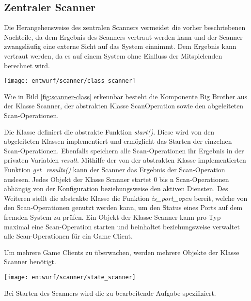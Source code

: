 \subsection{Zentraler Scanner}
Die Herangehensweise des zentralen Scanners vermeidet die vorher beschriebenen Nachteile, da dem Ergebnis des Scanners vertraut werden kann und der Scanner zwangsläufig eine externe Sicht auf das System einnimmt. Dem Ergebnis kann vertraut werden, da es auf einem System ohne Einfluss der Mitspielenden berechnet wird.

\begin{center}
	\texttt{[image: entwurf/scanner/class\_scanner]}
	\label{fig:scanner-class}
\end{center}

Wie in Bild \ref{fig:scanner-class} erkennbar besteht die Komponente Big Brother aus der Klasse Scanner, der abstrakten Klasse ScanOperation sowie den abgeleiteten Scan-Operationen.

Die Klasse  definiert die abstrakte Funktion \textit{start()}. Diese wird von den abgeleiteten Klassen implementiert und ermöglicht das Starten der einzelnen Scan-Operationen. Ebenfalls speichern alle Scan-Operationen ihr Ergebnis in der privaten Variablen \textit{result}. Mithilfe der von der abstrakten Klasse implementierten Funktion \textit{get\_results()} kann der Scanner das Ergebnis der Scan-Operation auslesen. Jedes Objekt der Klasse Scanner startet 0 bis n Scan-Operationen abhängig von der Konfiguration beziehungsweise den aktiven Diensten. Des Weiteren stellt die abstrakte Klasse die Funktion \textit{is\_port\_open} bereit, welche von den Scan-Operationen genutzt werden kann, um den Status eines Ports auf dem fremden System zu prüfen. Ein Objekt der Klasse Scanner kann pro Typ maximal eine Scan-Operation starten und beinhaltet beziehungsweise verwaltet alle Scan-Operationen für ein Game Client. 

Um mehrere Game Clients zu überwachen, werden mehrere Objekte der Klasse Scanner benötigt.

\begin{center}
	\texttt{[image: entwurf/scanner/state\_scanner]}
	\label{fig:scanner-state}
\end{center}

Bei Starten des Scanners wird die zu bearbeitende Aufgabe spezifiziert.

